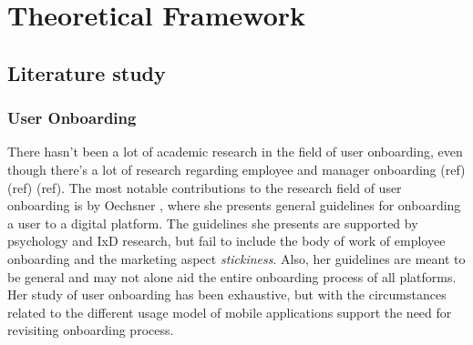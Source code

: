 

\chapter{Theoretical Framework}
\label{chap:theoretical_framework}
\section{Literature study}
\subsection{User Onboarding}
There hasn't been a lot of academic research in the field of user onboarding, even though there's a lot of research regarding employee and manager onboarding (ref) (ref) (ref). The most notable contributions to the research field of user onboarding is by Oechsner \cite{Oechsner2016}, where she presents general guidelines for onboarding a user to a digital platform. The guidelines she presents are supported by psychology and IxD research, but fail to include the body of work of employee onboarding and the marketing aspect \textit{stickiness}. Also, her guidelines are meant to be general and may not alone aid the entire onboarding process of all platforms. Her study of user onboarding has been exhaustive, but with the circumstances related to the different usage model of mobile applications support the need for revisiting onboarding process.

